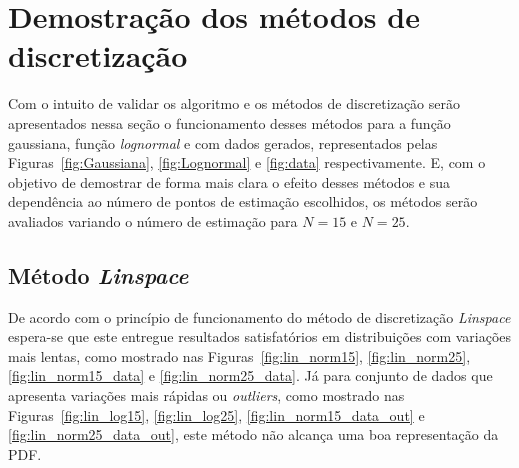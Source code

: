 
\section{Demostração dos métodos de discretização}

Com o intuito de validar os algoritmo e os métodos de discretização serão apresentados nessa seção o funcionamento desses métodos para a função gaussiana, função \textit{lognormal} e com dados gerados, representados pelas Figuras~\ref{fig:Gaussiana}, \ref{fig:Lognormal} e \ref{fig:data} respectivamente. E, com o objetivo de demostrar de forma mais clara o efeito desses métodos e sua dependência ao número de pontos de estimação escolhidos, os métodos serão avaliados variando o número de estimação para $ N = 15 $ e $ N = 25 $.

\subsection{Método \textit{Linspace}}

De acordo com o princípio de funcionamento do método de discretização \textit{Linspace} espera-se que este entregue resultados satisfatórios em distribuições com variações mais lentas, como mostrado nas Figuras~\ref{fig:lin_norm15}, \ref{fig:lin_norm25}, \ref{fig:lin_norm15_data} e \ref{fig:lin_norm25_data}. Já para conjunto de dados que apresenta variações mais rápidas ou \textit{outliers}, como mostrado nas Figuras~\ref{fig:lin_log15}, \ref{fig:lin_log25}, \ref{fig:lin_norm15_data_out} e \ref{fig:lin_norm25_data_out}, este método não alcança uma boa representação da PDF.


